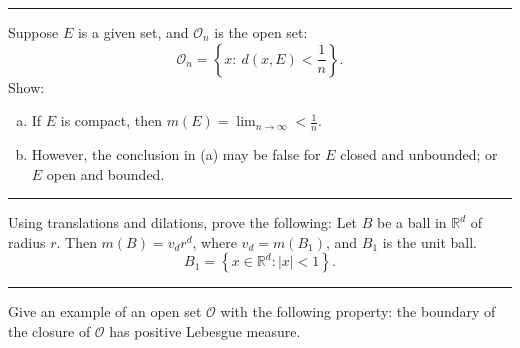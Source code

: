 \documentclass[letterpaper, 12pt]{article}
\begin{document}
\noindent\rule{7in}{2.8pt}
\begin{problem}{1.5}
Suppose \(E\) is a given set, and \(\mathcal{O}_n\) is the open set:
\[\mathcal{O}_n=\left\{ x:\ d(x,E)<\frac{1}{n} \right\}.\]
Show:
\begin{enumerate}[(a)]
    \item If \(E\) is compact, then \(m(E)=\lim_{n\to \infty}<\frac{1}{n}\).
    \item However, the conclusion in (a) may be false for \(E\) closed and unbounded; or \(E\) open and bounded.
\end{enumerate}
\end{problem}
\begin{solution}

\end{solution}

\noindent\rule{7in}{2.8pt}
\begin{problem}{1.6}
Using translations and dilations, prove the following: Let \(B\) be a ball in \(\mathbb{R}^d\) of radius \(r\). Then \(m(B)=v_d r^d\), where \(v_d=m(B_1)\), and \(B_1\) is the unit ball. 
\[B_1=\left\{ x\in \mathbb{R}^d: |x|<1 \right\}.\]
\end{problem}
\begin{solution}

\end{solution}

\noindent\rule{7in}{2.8pt}
\begin{problem}{1.9}
Give an example of an open set \(\mathcal{O}\) with the following property: the boundary of the closure of \(\mathcal{O}\) has positive Lebesgue measure.
\end{problem}
\begin{solution}

\end{solution}
\end{document}
